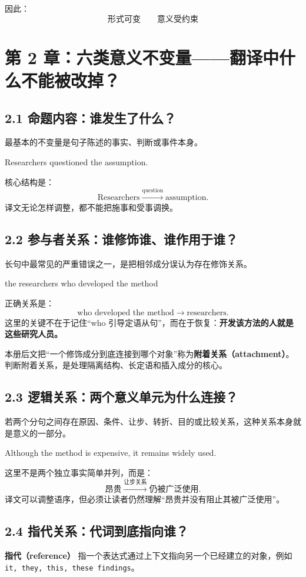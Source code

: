 \documentclass[11pt,a4paper]{ctexart}
\newcommand{\kw}[1]{\textbf{#1}}
\newcommand{\term}[2]{\textbf{#1（#2）}}
\begin{document}
因此：
\[
\boxed{\text{形式可变} \qquad \text{意义受约束}}
\]

\section{第 2 章：六类意义不变量——翻译中什么不能被改掉？}

\subsection{2.1 命题内容：谁发生了什么？}
最基本的不变量是句子陈述的事实、判断或事件本身。

\begin{eng}[例 3]
Researchers questioned the assumption.
\end{eng}
核心结构是：
\[
\text{Researchers}
\xrightarrow{\text{question}}
\text{assumption}.
\]
译文无论怎样调整，都不能把施事和受事调换。

\subsection{2.2 参与者关系：谁修饰谁、谁作用于谁？}
长句中最常见的严重错误之一，是把相邻成分误认为存在修饰关系。

\begin{eng}[例 4]
the researchers who developed the method
\end{eng}
正确关系是：
\[
\text{who developed the method}
\longrightarrow
\text{researchers}.
\]
这里的关键不在于记住“who 引导定语从句”，而在于恢复：\kw{开发该方法的人就是这些研究人员。}

本册后文把“一个修饰成分到底连接到哪个对象”称为\term{附着关系}{attachment}。判断附着关系，是处理隔离结构、长定语和插入成分的核心。

\subsection{2.3 逻辑关系：两个意义单元为什么连接？}
若两个分句之间存在原因、条件、让步、转折、目的或比较关系，这种关系本身就是意义的一部分。

\begin{eng}[例 5]
Although the method is expensive, it remains widely used.
\end{eng}
这里不是两个独立事实简单并列，而是：
\[
\text{昂贵}
\xrightarrow{\text{让步关系}}
\text{仍被广泛使用}.
\]
译文可以调整语序，但必须让读者仍然理解“昂贵并没有阻止其被广泛使用”。

\subsection{2.4 指代关系：代词到底指向谁？}
\term{指代}{reference} 指一个表达式通过上下文指向另一个已经建立的对象，例如 \texttt{it, they, this, these findings}。
\end{document}
